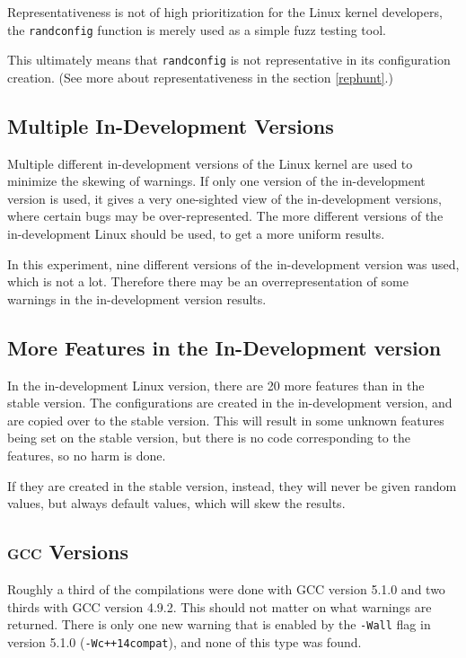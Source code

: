 \documentclass[a4paper,11pt]{report}
\begin{document}
Representativeness is not of high prioritization for the Linux kernel 
developers, the \texttt{randconfig} function is merely used as a simple fuzz 
testing tool.

This ultimately means that \texttt{randconfig} is not representative in its 
configuration creation. (See more about representativeness in the section 
\ref{rephunt}.)
\\



            \subsection{Multiple In-Development Versions}

Multiple different in-development versions of the Linux kernel are used to 
minimize the skewing of warnings. If only one version of the in-development 
version is used, it gives a very one-sighted view of the in-development 
versions, where certain bugs may be over-represented. The more different 
versions of the in-development Linux should be used, to get a more uniform 
results.

In this experiment, nine different versions of the in-development version was 
used, which is not a lot. Therefore there may be an overrepresentation of 
some warnings in the in-development version results.


            \subsection{More Features in the In-Development version}
In the in-development Linux version, there are 20 more features than in the 
stable version. The configurations are created in the in-development version, 
and are copied over to the stable version. This will result in some unknown 
features being set on the stable version, but there is no code corresponding to 
the features, so no harm is done.

If they are created in the stable version, instead, they will never be given 
random values, but always default values, which will skew the results.
\\


            \subsection{\textsc{gcc} Versions}
Roughly a third of the compilations were done with GCC version 5.1.0 and two 
thirds with GCC version 4.9.2. This should not matter on what warnings are 
returned. There is only one new warning that is enabled by the \texttt{-Wall} 
flag in version 5.1.0 (\texttt{-Wc++14compat}), and none of this type was found.
\\
\end{document}
